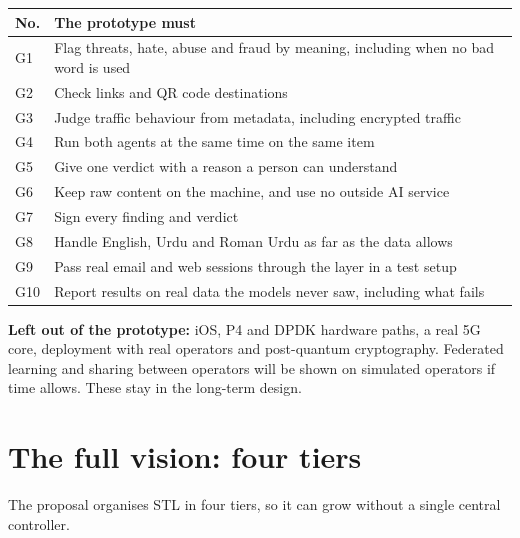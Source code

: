 \documentclass[11pt,a4paper]{article}
\newcommand{\need}[1][10]{\Needspace{#1\baselineskip}}
\begin{document}
\need[14]
\begin{center}
\begin{tabularx}{\linewidth}{P{1cm}Y}
\toprule
\textbf{No.} & \textbf{The prototype must} \\
\midrule
G1 & Flag threats, hate, abuse and fraud by meaning, including when no bad word is used \\
G2 & Check links and QR code destinations \\
G3 & Judge traffic behaviour from metadata, including encrypted traffic \\
G4 & Run both agents at the same time on the same item \\
G5 & Give one verdict with a reason a person can understand \\
G6 & Keep raw content on the machine, and use no outside AI service \\
G7 & Sign every finding and verdict \\
G8 & Handle English, Urdu and Roman Urdu as far as the data allows \\
G9 & Pass real email and web sessions through the layer in a test setup \\
G10 & Report results on real data the models never saw, including what fails \\
\bottomrule
\end{tabularx}
\end{center}

\textbf{Left out of the prototype:} iOS, P4 and DPDK hardware paths, a real 5G core, deployment with real operators and post-quantum cryptography. Federated learning and sharing between operators will be shown on simulated operators if time allows. These stay in the long-term design.

\need[25]
\section{The full vision: four tiers}

The proposal organises STL in four tiers, so it can grow without a single central controller.
\end{document}
